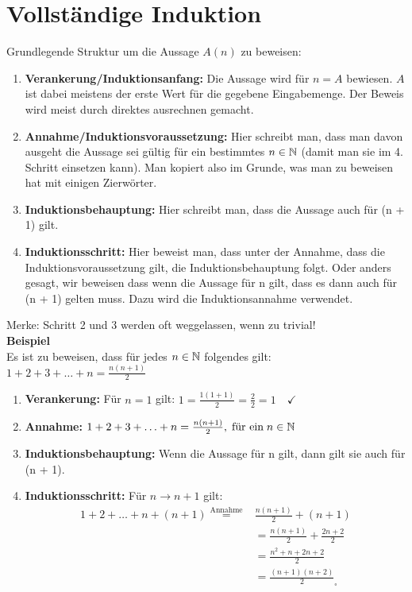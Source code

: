 \section{Vollständige Induktion}
Grundlegende Struktur um die Aussage $A(n)$ zu beweisen:
\begin{enumerate}
	\item \textbf{Verankerung/Induktionsanfang:} Die Aussage wird für $n = A$ bewiesen.
	$A$ ist dabei meistens der erste Wert für die gegebene Eingabemenge.
	Der Beweis wird meist durch direktes ausrechnen gemacht.
	\item \textbf{Annahme/Induktionsvoraussetzung:} Hier schreibt man,
	dass man davon ausgeht die Aussage sei gültig für ein bestimmtes $n \in \mathbb{N}$ (damit man sie im 4. Schritt
	einsetzen kann). Man kopiert also im Grunde, was man zu beweisen hat mit einigen Zierwörter.
	\item \textbf{Induktionsbehauptung:} Hier schreibt man, dass die Aussage auch für (n + 1) gilt.
	\item \textbf{Induktionsschritt:} Hier beweist man, dass unter der Annahme, dass die Induktionsvoraussetzung gilt, die Induktionsbehauptung folgt. Oder anders gesagt, wir beweisen dass wenn die Aussage für n gilt, dass es dann auch für (n + 1) gelten muss. Dazu wird die Induktionsannahme verwendet.
\end{enumerate}
Merke: Schritt 2 und 3 werden oft weggelassen, wenn zu trivial!\\
\textbf{Beispiel}\\
Es ist zu beweisen, dass für jedes $n \in \mathbb{N}$ folgendes gilt:\\
$1 + 2 + 3 + \ldots + n = \frac{n(n + 1)}{2}$
\begin{enumerate}
	\item \textbf{Verankerung:} Für $n = 1$ gilt: $1 = \frac{1 (1 + 1)}{2} = \frac{2}{2} = 1 \quad \checkmark$ 
	\item \textbf{Annahme:} $1 + 2 + 3 + \ldots + n = \frac{n(n+1)}{2}, \; \text{für ein} \; n \in \mathbb{N}$
	\item \textbf{Induktionsbehauptung:} Wenn die Aussage für n gilt, dann gilt sie auch für (n + 1).
	\item \textbf{Induktionsschritt:} Für $n \to n+1$ gilt:
	\begin{align*}
	1 + 2 + \ldots + n + (n+1) \overset{\text{Annahme}}{=} & \frac{n(n+1)}{2} + (n + 1)\\
	&= \frac{n(n+1)}{2} + \frac{2n + 2}{2} \\
	&= \frac{n^2 + n + 2n + 2}{2} \\
	&= \frac{(n + 1)(n + 2)}{2} _\square
	\end{align*}
\end{enumerate}